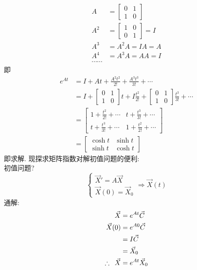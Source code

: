 \begin{align*}
A &=
\begin{bmatrix}
    0 & 1 \\
    1 & 0
\end{bmatrix}\\
A^2 &=
\begin{bmatrix}
    1 & 0 \\
    0 & 1
\end{bmatrix} = I \\ 
A^3 &= A^2 A = I A = A \\
A^4 &= A^3 A = A A = I \\
\cdots \cdots
\end{align*}
即
\begin{align*}
    e^{At} &= I + At + \frac{A^2 t^2}{2!} + \frac{A^3 t^3}{3!} + \cdots \\
    &= I + 
\begin{bmatrix}
    0 & 1 \\
    1 & 0
\end{bmatrix}t +I \frac{t^2}{2!}  + 
\begin{bmatrix}
    0 & 1 \\
    1 & 0
\end{bmatrix}\frac{t^3}{3!}  + \cdots \\
&=
\begin{bmatrix}
    1+\frac{t^2}{2!} + \cdots & t + \frac{t^3}{3!} + \cdots \\
    t + \frac{t^3}{3!} + \cdots & 1+\frac{t^2}{2!} + \cdots
\end{bmatrix}\\
&=
\begin{bmatrix}
    \cosh t & \sinh t \\
    \sinh t & \cosh t
\end{bmatrix}
\end{align*}
即求解.
\newpage
现探求矩阵指数对解初值问题的便利:\\
初值问题?
\[
\begin{cases}
    \vec{X}' = A \vec{X} \\
    \vec{X}(0) = \vec{X}_0
\end{cases}
\Longrightarrow \vec{X}(t)
\]
通解:
\begin{align*}
    \vec{X} &= e^{At} \vec{C} \\
    \vec{X}(0) &= e^{A0} \vec{C} \\
    &= I \vec{C} \\
    &= \vec{X}_0 \\
    \therefore \hspace*{0.5em} \vec{X} &= e^{At} \vec{X}_0
\end{align*}
